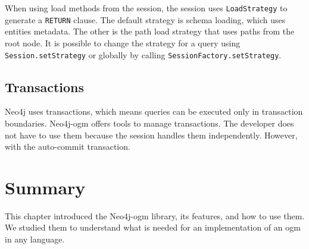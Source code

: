 When using load methods from the session, the session uses \texttt{LoadStrategy} to generate a \texttt{RETURN} clause. The default strategy is schema loading,
which uses entities metadata. The other is the path load strategy that uses paths from the root node. It is possible to change the strategy for a query using \texttt{Session.setStrategy}
or globally by calling \texttt{SessionFactory.setStrategy}.

\subsection{Transactions}

Neo4j uses transactions, which means queries can be executed only in transaction boundaries. Neo4j-\acrshort{ogm}
offers tools to manage transactions. The developer does not have to use them because the session handles them independently. However, with the auto-commit transaction.

\section{Summary}

This chapter introduced the Neo4j-\acrshort{ogm} library, its features, and how to use them. We studied them to understand what is needed for
an implementation of an \acrshort{ogm} in any language.